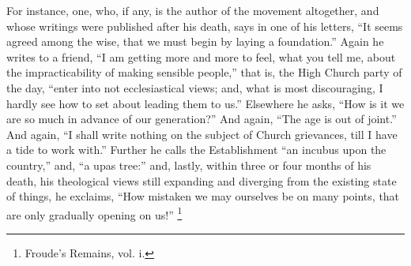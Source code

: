 For instance, one, who, if any, is the author of the movement
altogether, and whose writings were published after his death, says in
one of his letters, ``It seems agreed among the wise, that we must
begin by laying a foundation.'' Again he writes to a friend,
``I am getting more and more to feel, what you tell me, about the
impracticability of making sensible people,'' that is, the High
Church party of the day, ``enter into not ecclesiastical views;
and, what is most discouraging, I hardly see how to set about leading
them to us.'' Elsewhere he asks, ``How is it we are so much in
advance of our generation?'' And again, ``The age is out of
joint.'' And again, ``I shall write nothing on the subject of
Church grievances, till I have a tide to work with.'' Further he
calls the Establishment ``an incubus upon the country,'' and,
``a upas tree:'' and, lastly, within three or four months of
his death, his theological views still expanding and diverging from
the existing state of things, he exclaims, ``How mistaken we may
ourselves be on many points, that are only gradually opening on
us!'' \footnote{Froude's Remains, vol. i.}

